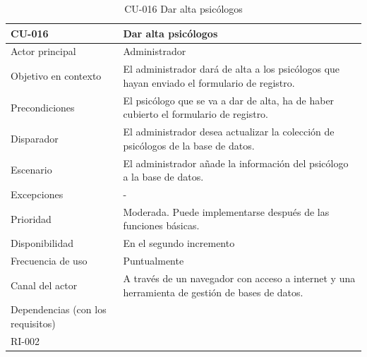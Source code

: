\clearpage


\begin{table}[htpb]
\centering
\begin{tabularx}{\textwidth}{|X|X|}
\hline
CU-016                            & Dar alta psicólogos                                                                            \\ \hline
Actor principal                   & Administrador                                                                                  \\ \hline
Objetivo en contexto              & El administrador dará de alta a los psicólogos que hayan enviado el formulario de registro.    \\ \hline
Precondiciones                    & El psicólogo que se va a dar de alta, ha de haber cubierto el formulario de registro.          \\ \hline
Disparador                        & El administrador desea actualizar la colección de psicólogos de la base de datos.              \\ \hline
Escenario                         & El administrador añade la información del psicólogo a la base de datos.                        \\ \hline
Excepciones                       & -                                                                                              \\ \hline
Prioridad                         & Moderada. Puede implementarse después de las funciones básicas.                                \\ \hline
Disponibilidad                    & En el segundo incremento                                                                       \\ \hline
Frecuencia de uso                 & Puntualmente                                                                                   \\ \hline
Canal del actor                   & A través de un navegador con acceso a internet y una herramienta de gestión de bases de datos. \\ \hline
Dependencias (con los requisitos) & \begin{tabular}[c]{@{}l@{}}RI-003\\ RI-002\end{tabular}                                        \\ \hline
\end{tabularx}
\caption{CU-016 Dar alta psicólogos}                          
\end{table}

